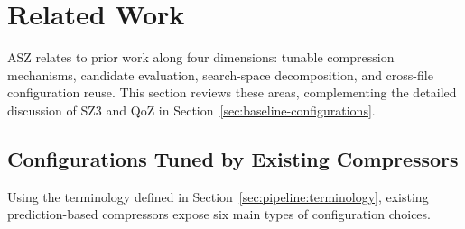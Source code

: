 \section{Related Work}
\label{sec:related-work}

ASZ relates to prior work along four dimensions: tunable compression mechanisms, candidate evaluation, search-space decomposition, and cross-file configuration reuse. This section reviews these areas, complementing the detailed discussion of SZ3 and QoZ in Section~\ref{sec:baseline-configurations}.

\subsection{Configurations Tuned by Existing Compressors}
\label{sec:related-work:dimensions}

Using the terminology defined in Section~\ref{sec:pipeline:terminology}, existing prediction-based compressors expose six main types of configuration choices.

